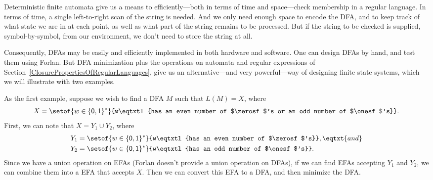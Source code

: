 %
%
Deterministic finite automata give us a means to efficiently---both in
terms of time and space---check membership in a regular language.  In
terms of time, a single left-to-right scan of the string is needed.
And we only need enough space to encode the DFA, and to keep track of
what state we are in at each point, as well as what part of the string
remains to be processed.  But if the string to be checked is
supplied, symbol-by-symbol, from our environment, we don't need to
store the string at all.

Consequently, DFAs may be easily and efficiently implemented in both
hardware and software.  One can design DFAs by hand, and test them
using Forlan.  But DFA minimization plus the operations on automata
and regular expressions of
Section~\ref{ClosurePropertiesOfRegularLanguages}, give us an
alternative---and very powerful---way of designing finite state
systems, which we will illustrate with two examples.

As the first example, suppose we wish to find a DFA $M$ such that
$L(M)=X$, where
\begin{displaymath}
X=\setof{w\in\mathsf{\{0,1\}^*}}{w\eqtxtl{has an even
    number of $\zerosf$'s or an odd number of $\onesf$'s}} .  
\end{displaymath}
First, we can note that $X=Y_1\cup Y_2$, where
\begin{align*}
Y_1 &= \setof{w\in\mathsf{\{0,1\}^*}}{w\eqtxtl{has an even
    number of $\zerosf$'s}}, \eqtxt{and} \\
Y_2 &= \setof{w\in\mathsf{\{0,1\}^*}}{w\eqtxtl{has an odd number of
    $\onesf$'s}}.
\end{align*}
Since we have a union operation on EFAs (Forlan
doesn't provide a union operation on DFAs), if we can find EFAs
accepting $Y_1$ and $Y_2$, we can combine them into a EFA that accepts
$X$.  Then we can convert this EFA to a DFA, and then minimize the
DFA.

